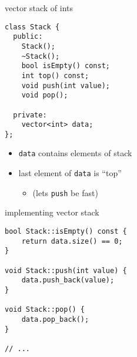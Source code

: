\begin{comment}
\begin{frame}[fragile,label=implLLStack]{implementing linked list stack}
\lstset{language=C++,style=small}
\begin{lstlisting}
bool Stack::isEmpty() cosnt {
    return head == NULL;
}

int Stack::top() const {
    // FIXME: throw exception if empty?
    return head->value;
}
\end{lstlisting}
\end{frame}
\end{comment}

\begin{frame}[fragile,label=vectorStack]{vector stack of ints}
\lstset{language=C++,style=smaller}
\begin{lstlisting}
class Stack {
  public:
    Stack();
    ~Stack();
    bool isEmpty() const;
    int top() const;
    void push(int value);
    void pop();

  private:
    vector<int> data;
};
\end{lstlisting}
\begin{itemize}
\item \texttt{data} contains elements of stack
\item last element of \texttt{data} is ``top''
    \begin{itemize}
    \item (lets \texttt{push} be fast)
    \end{itemize}
\end{itemize}
\end{frame}

\begin{frame}[fragile,label=vectorStackImpl]{implementing vector stack}
\lstset{language=C++,style=small}
\begin{lstlisting}
bool Stack::isEmpty() const {
    return data.size() == 0;
}

void Stack::push(int value) {
    data.push_back(value);
}

void Stack::pop() {
    data.pop_back();
}

// ...
\end{lstlisting}
\end{frame}

